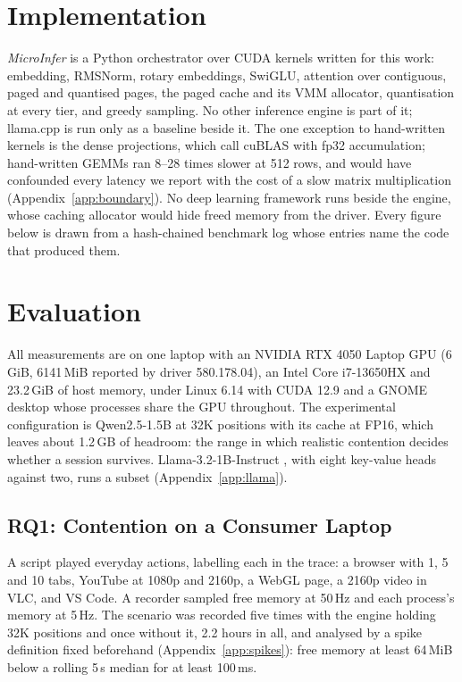 \documentclass{article}
\begin{document}
\section{Implementation}
\label{sec:implementation}

\textit{MicroInfer} is a Python orchestrator over CUDA kernels written for
this work: embedding, RMSNorm, rotary embeddings, SwiGLU, attention over
contiguous, paged and quantised pages, the paged cache and its VMM allocator,
quantisation at every tier, and greedy sampling. No other
inference engine is part of it; llama.cpp is run only as a baseline beside it.
The one exception to hand-written kernels is the dense projections, which call
cuBLAS \citep{cublas} with fp32 accumulation; hand-written GEMMs ran 8--28 times slower at 512 rows,
and would have confounded every latency we report with the cost of a slow
matrix multiplication (Appendix~\ref{app:boundary}). No deep learning
framework runs beside the engine, whose caching allocator would hide freed
memory from the driver. Every figure below is drawn from a hash-chained
benchmark log whose entries name the code that produced them.

\section{Evaluation}
\label{sec:evaluation}

All measurements are on one laptop with an NVIDIA RTX 4050 Laptop GPU (6\,GiB,
6141\,MiB reported by driver 580.178.04), an Intel Core i7-13650HX and
23.2\,GiB of host memory, under Linux 6.14 with CUDA 12.9 and a GNOME desktop
whose processes share the GPU throughout. The experimental configuration is
Qwen2.5-1.5B at 32K positions with its cache at FP16, which leaves about
1.2\,GB of headroom: the range in which realistic contention decides whether a
session survives. Llama-3.2-1B-Instruct \citep{llama3herd}, with eight key-value
heads against two, runs a subset (Appendix~\ref{app:llama}).

\subsection{RQ1: Contention on a Consumer Laptop}
\label{sec:rq1}

A script played everyday actions, labelling each in the trace: a browser with
1, 5 and 10 tabs, YouTube at 1080p and 2160p, a WebGL page, a 2160p video in
VLC, and VS Code. A recorder sampled free memory at 50\,Hz and each process's
memory at 5\,Hz. The scenario was recorded five times with the engine holding
32K positions and once without it, 2.2 hours in all, and analysed by a spike
definition fixed beforehand (Appendix~\ref{app:spikes}): free memory at least
64\,MiB below a rolling 5\,s median for at least 100\,ms.
\end{document}
